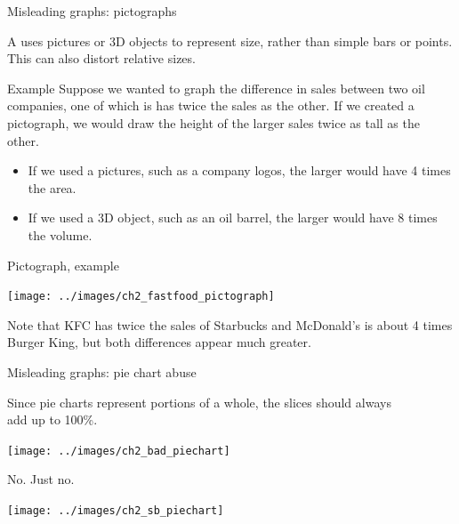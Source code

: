\documentclass[xcolor=table, handout]{beamer}
\begin{document}
\begin{frame}{Misleading graphs: pictographs}
\begin{block}{}
A  uses pictures or 3D objects to represent size, rather than simple bars or points. This can also distort relative sizes.
\end{block}

\pause
\begin{exampleblock}{Example}
Suppose we wanted to graph the difference in sales between two oil companies, one of which is has twice the sales as the other. If we created a pictograph, we would draw the height of the larger sales twice as tall as the other.
\begin{itemize}
\item If we used a pictures, such as a company logos, the larger would have 4 times the area.
\item If we used a 3D object, such as an oil barrel, the larger would have 8 times the volume. 
\end{itemize}
\end{exampleblock}
\end{frame}

\begin{frame}{Pictograph, example}
\begin{center}
\texttt{[image: ../images/ch2\_fastfood\_pictograph]}
\end{center}
\begin{block}{}
Note that KFC has twice the sales of Starbucks and McDonald's is about 4 times Burger King, but both differences appear much greater.
\end{block}
\end{frame}

\begin{frame}{Misleading graphs: pie chart abuse}
\begin{block}{}
Since pie charts represent portions of a whole, the slices should always\\ add up to 100\%.
\end{block}
\pause
\begin{center}
\texttt{[image: ../images/ch2\_bad\_piechart]}
\end{center}

\end{frame}

\begin{frame}{No. Just no.}
\begin{center}
\texttt{[image: ../images/ch2\_sb\_piechart]}
\end{center}
\end{frame}
\end{document}
